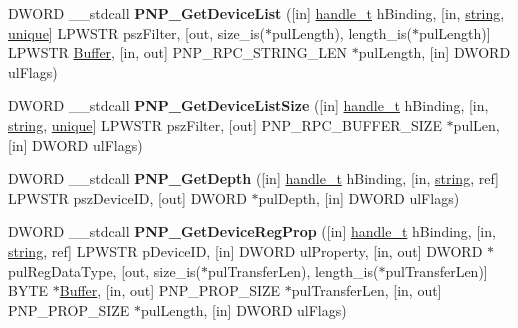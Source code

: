 \begin{DoxyCompactItemize}
\item 
\mbox{\label{interfacepnp_a28d580b620a2ab115888e3ffcde71bde}} 
D\+W\+O\+RD \+\_\+\+\_\+stdcall {\bfseries P\+N\+P\+\_\+\+Get\+Device\+List} (\mbox{[}in\mbox{]} \hyperlink{interfacevoid}{handle\+\_\+t} h\+Binding, \mbox{[}in, \hyperlink{structstring}{string}, \hyperlink{interfaceunique}{unique}\mbox{]} L\+P\+W\+S\+TR psz\+Filter, \mbox{[}out, size\+\_\+is($\ast$pul\+Length), length\+\_\+is($\ast$pul\+Length)\mbox{]} L\+P\+W\+S\+TR \hyperlink{class_buffer}{Buffer}, \mbox{[}in, out\mbox{]} P\+N\+P\+\_\+\+R\+P\+C\+\_\+\+S\+T\+R\+I\+N\+G\+\_\+\+L\+EN $\ast$pul\+Length, \mbox{[}in\mbox{]} D\+W\+O\+RD ul\+Flags)
\item 
\mbox{\label{interfacepnp_a44504da17a5da9547b26df77cf818529}} 
D\+W\+O\+RD \+\_\+\+\_\+stdcall {\bfseries P\+N\+P\+\_\+\+Get\+Device\+List\+Size} (\mbox{[}in\mbox{]} \hyperlink{interfacevoid}{handle\+\_\+t} h\+Binding, \mbox{[}in, \hyperlink{structstring}{string}, \hyperlink{interfaceunique}{unique}\mbox{]} L\+P\+W\+S\+TR psz\+Filter, \mbox{[}out\mbox{]} P\+N\+P\+\_\+\+R\+P\+C\+\_\+\+B\+U\+F\+F\+E\+R\+\_\+\+S\+I\+ZE $\ast$pul\+Len, \mbox{[}in\mbox{]} D\+W\+O\+RD ul\+Flags)
\item 
\mbox{\label{interfacepnp_ad9bb1312c4265f0bfb99ba1df21e2137}} 
D\+W\+O\+RD \+\_\+\+\_\+stdcall {\bfseries P\+N\+P\+\_\+\+Get\+Depth} (\mbox{[}in\mbox{]} \hyperlink{interfacevoid}{handle\+\_\+t} h\+Binding, \mbox{[}in, \hyperlink{structstring}{string}, ref\mbox{]} L\+P\+W\+S\+TR psz\+Device\+ID, \mbox{[}out\mbox{]} D\+W\+O\+RD $\ast$pul\+Depth, \mbox{[}in\mbox{]} D\+W\+O\+RD ul\+Flags)
\item 
\mbox{\label{interfacepnp_a9d740a43819b38c827fa6fd27c591c6b}} 
D\+W\+O\+RD \+\_\+\+\_\+stdcall {\bfseries P\+N\+P\+\_\+\+Get\+Device\+Reg\+Prop} (\mbox{[}in\mbox{]} \hyperlink{interfacevoid}{handle\+\_\+t} h\+Binding, \mbox{[}in, \hyperlink{structstring}{string}, ref\mbox{]} L\+P\+W\+S\+TR p\+Device\+ID, \mbox{[}in\mbox{]} D\+W\+O\+RD ul\+Property, \mbox{[}in, out\mbox{]} D\+W\+O\+RD $\ast$pul\+Reg\+Data\+Type, \mbox{[}out, size\+\_\+is($\ast$pul\+Transfer\+Len), length\+\_\+is($\ast$pul\+Transfer\+Len)\mbox{]} B\+Y\+TE $\ast$\hyperlink{class_buffer}{Buffer}, \mbox{[}in, out\mbox{]} P\+N\+P\+\_\+\+P\+R\+O\+P\+\_\+\+S\+I\+ZE $\ast$pul\+Transfer\+Len, \mbox{[}in, out\mbox{]} P\+N\+P\+\_\+\+P\+R\+O\+P\+\_\+\+S\+I\+ZE $\ast$pul\+Length, \mbox{[}in\mbox{]} D\+W\+O\+RD ul\+Flags)

\end{DoxyCompactItemize}
